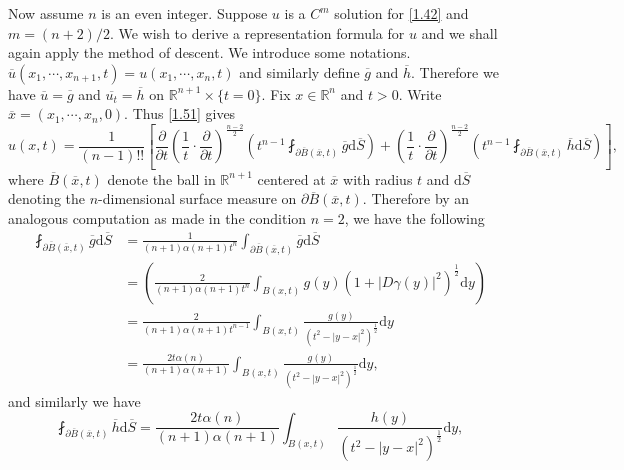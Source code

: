 Now assume $n$ is an even integer. Suppose $u$ is a $C^m$ solution for \eqref{1.42} and $m=(n+2)/2$. We wish to derive a representation formula for $u$ and we shall again apply the method of descent. We introduce some notations. $\overline{u}(x_1,\cdots,x_{n+1},t)=u(x_1,\cdots,x_n,t)$ and similarly define $\overline{g}$ and $\overline{h}$. Therefore we have $\overline{u}=\overline{g}$ and $\overline{u_t}=\overline{h}$ on $\mathbb{R}^{n+1}\times\{t=0\}$. Fix $x\in\mathbb{R}^n$ and $t>0$. Write $\overline{x}=(x_1,\cdots,x_n,0)$. Thus \eqref{1.51} gives 
$$
u\left( x,t \right) =\frac{1}{\left( n-1 \right) !!}\left[ \frac{\partial}{\partial t}\left( \frac{1}{t}\cdot \frac{\partial}{\partial t} \right) ^{\frac{n-2}{2}}\left( t^{n-1}\fint_{\partial \overline{B}\left( \overline{x},t \right)}{\overline{g}\mathrm{d}\overline{S}} \right) +\left( \frac{1}{t}\cdot \frac{\partial}{\partial t} \right) ^{\frac{n-2}{2}}\left( t^{n-1}\fint_{\partial \overline{B}\left( \overline{x},t \right)}{\overline{h}\mathrm{d}\overline{S}} \right) \right] ,
$$
where $\overline{B}(\overline{x},t)$ denote the ball in $\mathbb{R}^{n+1}$ centered at $\overline{x}$ with radius $t$ and $\mathrm{d}\overline{S}$ denoting the $n$-dimensional surface measure on $\partial\overline{B}(\overline{x},t)$. Therefore by an analogous computation as made in the condition $n=2$, we have the following 
$$
\begin{aligned}
\fint_{\partial \overline{B}\left( \overline{x},t \right)}{\overline{g}\mathrm{d}\overline{S}}&=\frac{1}{\left( n+1 \right) \alpha \left( n+1 \right) t^n}\int_{\partial \overline{B}\left( \overline{x},t \right)}{\overline{g}\mathrm{d}\overline{S}}
\\
&=\left( \frac{2}{\left( n+1 \right) \alpha \left( n+1 \right) t^n}\int_{B\left( x,t \right)}{g\left( y \right) \left( 1+\left| D\gamma \left( y \right) \right|^2 \right) ^{\frac{1}{2}}\mathrm{d}y} \right) 
\\
&=\frac{2}{\left( n+1 \right) \alpha \left( n+1 \right) t^{n-1}}\int_{B\left( x,t \right)}{\frac{g\left( y \right)}{\left( t^2-\left| y-x \right|^2 \right) ^{\frac{1}{2}}}\mathrm{d}y}
\\
&=\frac{2t\alpha \left( n \right)}{\left( n+1 \right) \alpha \left( n+1 \right)}\int_{B\left( x,t \right)}{\frac{g\left( y \right)}{\left( t^2-\left| y-x \right|^2 \right) ^{\frac{1}{2}}}\mathrm{d}y},
\end{aligned}
$$
and similarly we have 
$$
\fint_{\partial \overline{B}\left( \overline{x},t \right)}{\overline{h}\mathrm{d}\overline{S}}=\frac{2t\alpha \left( n \right)}{\left( n+1 \right) \alpha \left( n+1 \right)}\int_{B\left( x,t \right)}{\frac{h\left( y \right)}{\left( t^2-\left| y-x \right|^2 \right) ^{\frac{1}{2}}}\mathrm{d}y},
$$
